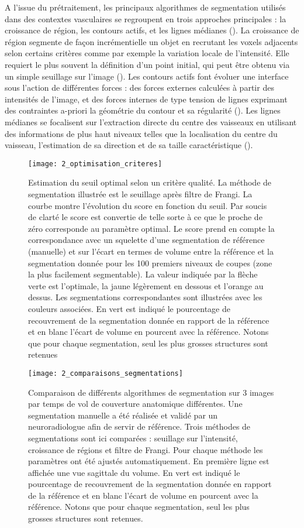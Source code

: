 A l’issue du prétraitement, les principaux algorithmes de segmentation utilisés dans des contextes vasculaires se regroupent en trois approches principales : la croissance de région, les contours actifs, et les lignes médianes (\cite{Lesage2009}). La croissance de région segmente de façon incrémentielle un objet en recrutant les voxels adjacents selon certains critères comme par exemple la variation locale de l’intensité. Elle requiert le plus souvent la définition d’un point initial, qui peut être obtenu via un simple seuillage sur l’image (\cite{Boskamp2004}). Les contours actifs font évoluer une interface sous l’action de différentes forces : des forces externes calculées à partir des intensités de l’image, et des forces internes de type tension de lignes exprimant des contraintes a-priori la géométrie du contour et sa régularité (\cite{McInerney1996}). Les lignes médianes se focalisent sur l’extraction directe du centre des vaisseaux en utilisant des informations de plus haut niveaux telles que la localisation du centre du vaisseau, l’estimation de sa direction et de sa taille caractéristique (\cite{Aylward2002}).\\
\begin{figure}[!t]
\centering
\texttt{[image: 2\_optimisation\_criteres]}
\caption{Estimation du seuil optimal selon un critère qualité. La méthode de segmentation illustrée est le seuillage après filtre de Frangi. La courbe montre l'évolution du score en fonction du seuil. Par soucis de clarté le score est convertie de telle sorte à ce que le proche de zéro corresponde au paramètre optimal. Le score prend en compte la correspondance avec un squelette d'une segmentation de référence (manuelle) et sur l'écart en termes de volume entre la référence et la segmentation donnée pour les 100 premiers niveaux de coupes (zone la plus facilement segmentable). La valeur indiquée par la flèche verte est l'optimale, la jaune légèrement en dessous et l'orange au dessus. Les segmentations correspondantes sont illustrées avec les couleurs associées. En vert est indiqué le pourcentage de recouvrement de la segmentation donnée en rapport de la référence et en blanc l'écart de volume en pourcent avec la référence. Notons que pour chaque segmentation, seul les plus grosses structures sont retenues}
\label{fig:2_optimisation_criteres}	
\end{figure}
\begin{figure}[!t]
\centering
\texttt{[image: 2\_comparaisons\_segmentations]}
\caption{Comparaison de différents algorithmes de segmentation sur 3 images par temps de vol de couverture anatomique différentes. Une segmentation manuelle a été réalisée et validé par un neuroradiologue afin de servir de référence. Trois méthodes de segmentations sont ici comparées : seuillage sur l'intensité, croissance de régions et filtre de Frangi. Pour chaque méthode les paramètres ont été ajustés automatiquement. En première ligne est affichée une vue sagittale du volume. En vert est indiqué le pourcentage de recouvrement de la segmentation donnée en rapport de la référence et en blanc l'écart de volume en pourcent avec la référence. Notons que pour chaque segmentation, seul les plus grosses structures sont retenues.}
\label{fig:2_comparaisons_segmentations}	
\end{figure}
